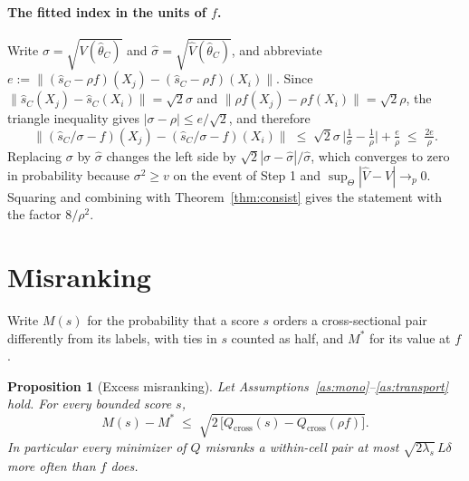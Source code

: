 \documentclass[11pt]{article}
\newtheorem{proposition}{Proposition}
\theoremstyle{remark}
\newcommand{\Qc}{Q_{\mathrm{cross}}}
\newcommand{\Qt}{Q}
\begin{document}
\paragraph{The fitted index in the units of $f$.} Write $\sigma = \sqrt{V(\hat\theta_C)}$ and
$\hat\sigma = \sqrt{\hat V(\hat\theta_C)}$, and abbreviate
$e := \|(\hat s_C-\rho f)(X_j)-(\hat s_C-\rho f)(X_i)\|$. Since $\|\hat s_C(X_j)-\hat s_C(X_i)\| =
\sqrt2\sigma$ and $\|\rho f(X_j)-\rho f(X_i)\| = \sqrt2\rho$, the triangle inequality gives
$|\sigma-\rho| \le e/\sqrt2$, and therefore
\[
    \big\|(\hat s_C/\sigma - f)(X_j)-(\hat s_C/\sigma - f)(X_i)\big\|
    \;\le\; \sqrt2\sigma\,\Big|\tfrac1\sigma-\tfrac1\rho\Big| + \tfrac{e}{\rho}
    \;\le\; \tfrac{2e}{\rho}.
\]
Replacing $\sigma$ by $\hat\sigma$ changes the left side by $\sqrt2|\sigma-\hat\sigma|/\hat\sigma$, which
converges to zero in probability because $\sigma^{2} \ge v$ on the event of Step 1 and
$\sup_\Theta|\hat V - V| \to_p 0$. Squaring and combining with Theorem~\ref{thm:consist} gives the
statement with the factor $8/\rho^{2}$.

\section{Misranking}\label{app:misrank}

Write $M(s)$ for the probability that a score $s$ orders a cross-sectional pair differently from its
labels, with ties in $s$ counted as half, and $M^{*}$ for its value at $f$.

\begin{proposition}[Excess misranking]\label{prop:misrank}
Let Assumptions~\ref{as:mono}--\ref{as:transport} hold. For every bounded score $s$,
\[
    M(s) - M^{*} \;\le\; \sqrt{2\,\big[\Qc(s) - \Qc(\rho f)\big]} .
\]
In particular every minimizer of $\Qt$ misranks a within-cell pair at most
$\sqrt{2\lambda_{s}}\,L\delta$ more often than $f$ does.
\end{proposition}
\end{document}
